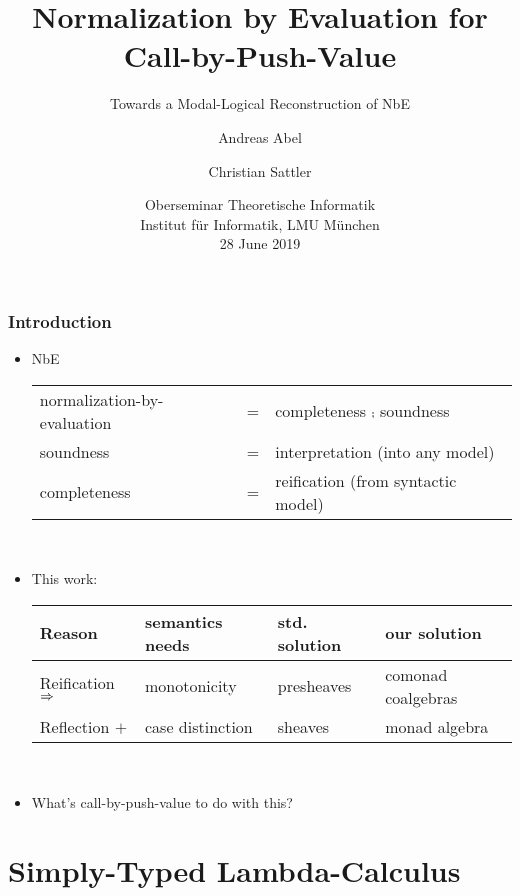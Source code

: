 \documentclass[t,fleqn,usenames,dvipsnames]{beamer}
\title[NbE for CBPV]{Normalization by Evaluation for Call-by-Push-Value}
\subtitle{Towards a Modal-Logical Reconstruction of NbE}
\author[Abel]{
  Andreas Abel\inst{1}
  \and Christian Sattler\inst{2}
}
\institute[] %
{
  \inst{1}%
  Department of Computer Science and Engineering\\
  Chalmers and Gothenburg University, Sweden \\[1ex]
  \and
  \inst{2}%
  School of Computer Science\\
  University of Nottingham, UK \\[1ex]
}
\date[OSem Jun 2019] %
{ Oberseminar Theoretische Informatik \\
  Institut für Informatik, LMU München \\
  28 June 2019
}
\begin{document}
\maketitle



\begin{frame}%
\frametitle{Introduction}
\begin{itemize}
\item NbE \\[2ex]
    \begin{tabular}{@{}lcl@{}}
normalization-by-evaluation & = & completeness $\comp$ soundness \\
soundness & = & interpretation (into any model) \\
completeness & = & reification (from syntactic model) \\
    \end{tabular}
\\[1ex]

\item This work: \\[2ex]
  \begin{tabular}{@{}llll@{}}
Reason & semantics needs & std. solution & our solution \\
\hline
Reification $\Rightarrow$ & monotonicity & presheaves & comonad coalgebras \\
Reflection  $+$   & case distinction & sheaves & monad algebra \\
  \end{tabular}
\\[1ex]

\item What's call-by-push-value to do with this?
\end{itemize}
\end{frame}


\section{Simply-Typed Lambda-Calculus}

\end{document}
